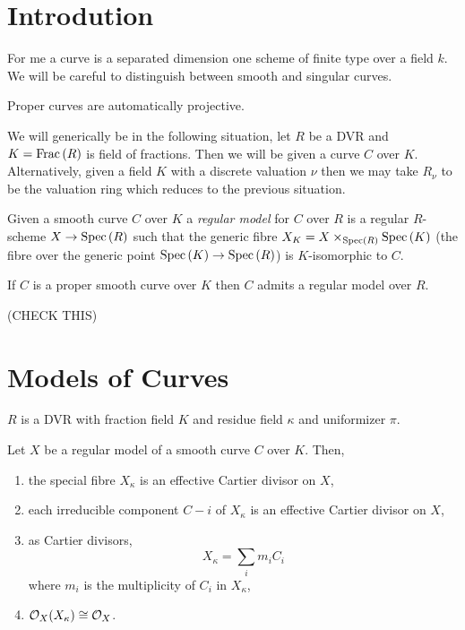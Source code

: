 \documentclass[12pt]{article}
\begin{document}
\section{Introdution}

\begin{remark}
For me a curve is a separated dimension one scheme of finite type over a field $k$. We will be careful to distinguish between smooth and singular curves.
\end{remark}

\begin{proposition}
Proper curves are automatically projective.
\end{proposition}

\begin{remark}
We will generically be in the following situation, let $R$ be a DVR and $K = \mathrm{Frac}\left(R\right)$ is field of fractions. Then we will be given a curve $C$ over $K$. 
\bigskip\\
Alternatively, given a field $K$ with a discrete valuation $\nu$ then we may take $R_\nu$ to be the valuation ring which reduces to the previous situation.
\end{remark}

\begin{definition}
Given a smooth curve $C$ over $K$ a \textit{regular model} for $C$ over $R$ is a regular $R$-scheme $X \to \mathrm{Spec}\left( R \right)$ such that the generic fibre $X_K = X \times_{\mathrm{Spec}\left( R \right)} \mathrm{Spec}\left( K \right)$ (the fibre over the generic point $\mathrm{Spec}\left( K \right) \to \mathrm{Spec}\left( R \right)$) is $K$-isomorphic to $C$. 
\end{definition}

\begin{theorem}
If $C$ is a proper smooth curve over $K$ then $C$ admits a regular model over $R$. 
\end{theorem}

(CHECK THIS)

\section{Models of Curves}

\begin{remark}
$R$ is a DVR with fraction field $K$ and residue field $\kappa$ and uniformizer $\pi$.
\end{remark}

\begin{lemma}[01WS]
Let $X$ be a regular model of a smooth curve $C$ over $K$. Then,
\begin{enumerate}
\item the special fibre $X_\kappa$ is an effective Cartier divisor on $X$,
\item each irreducible component $C-i$ of $X_\kappa$ is an effective Cartier divisor on $X$,
\item as Cartier divisors,
\[ X_\kappa = \sum_i m_i C_i \]
where $m_i$ is the multiplicity of $C_i$ in $X_\kappa$,
\item $\mathcal{O}_{X}(X_\kappa) \cong \mathcal{O}_{X}$. 
\end{enumerate}
\end{lemma}
\end{document}
